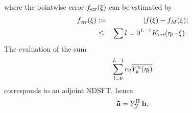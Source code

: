 where the pointwise error $f_{\text{\textsl{err}}}{\hspace{-0.4ex}}\left(\xi\right)$ can be estimated by
\begin{eqnarray*}
  f_{\text{\textsl{err}}}{\hspace{-0.4ex}}\left(\xi\right) &  := & \left\vert f{\hspace{-0.4ex}}\left(\xi\right) - f_{M}{\hspace{-0.4ex}}\left(\xi\right)\right\vert\\
                                     & \le & \sum{l=0}^{L-1} K_{\text{\textsl{err}}}{\hspace{-0.4ex}}\left(\mathbf{\eta}_{l} \cdot \mathbf{\xi}\right).
\end{eqnarray*}
The evaluation of the sum
$$
  \sum_{l = 0}^{L-1} \alpha_{l} \overline{Y_{k}^n{\hspace{-0.4ex}}\left(\mathbf{\eta}_{l}\right)}
$$
corresponds to an adjoint NDSFT, hence
$$
  \mathbf{\tilde{a}} = Y_{\mathcal{Y}}^{\text{\rm{H}}} \: \mathbf{b}.
$$




